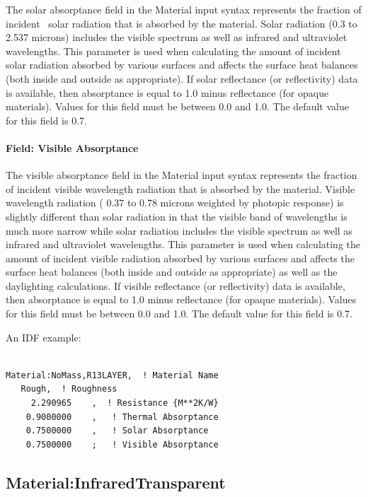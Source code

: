 The solar absorptance field in the Material input syntax represents the fraction of incident~ solar radiation that is absorbed by the material. Solar radiation (0.3 to 2.537 microns) includes the visible spectrum as well as infrared and ultraviolet wavelengths. This parameter is used when calculating the amount of incident solar radiation absorbed by various surfaces and affects the surface heat balances (both inside and outside as appropriate). If solar reflectance (or reflectivity) data is available, then absorptance is equal to 1.0 minus reflectance (for opaque materials). Values for this field must be between 0.0 and 1.0. The default value for this field is 0.7.

\paragraph{Field: Visible Absorptance}\label{field-visible-absorptance-1}

The visible absorptance field in the Material input syntax represents the fraction of incident visible wavelength radiation that is absorbed by the material. Visible wavelength radiation ( 0.37 to 0.78 microns weighted by photopic response) is slightly different than solar radiation in that the visible band of wavelengths is much more narrow while solar radiation includes the visible spectrum as well as infrared and ultraviolet wavelengths. This parameter is used when calculating the amount of incident visible radiation absorbed by various surfaces and affects the surface heat balances (both inside and outside as appropriate) as well as the daylighting calculations. If visible reflectance (or reflectivity) data is available, then absorptance is equal to 1.0 minus reflectance (for opaque materials). Values for this field must be between 0.0 and 1.0. The default value for this field is 0.7.

An IDF example:

\begin{lstlisting}

Material:NoMass,R13LAYER,  ! Material Name
   Rough,  ! Roughness
     2.290965    ,  ! Resistance {M**2K/W}
    0.9000000    ,   ! Thermal Absorptance
    0.7500000    ,   ! Solar Absorptance
    0.7500000    ;   ! Visible Absorptance
\end{lstlisting}

\subsection{Material:InfraredTransparent}\label{materialinfraredtransparent}

